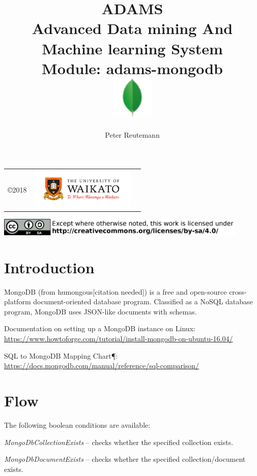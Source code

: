 \documentclass[a4paper]{book}
\title{
  \textbf{ADAMS} \\
  {\Large \textbf{A}dvanced \textbf{D}ata mining \textbf{A}nd \textbf{M}achine
  learning \textbf{S}ystem} \\
  {\Large Module: adams-mongodb} \\
  \vspace{1cm}
  \includegraphics[width=2cm]{images/mongodb-module.png} \\
}
\author{
  Peter Reutemann
}
\begin{document}
\begin{titlepage}
\maketitle

\thispagestyle{empty}
\center
\begin{table}[b]
	\begin{tabular}{c l l}
		\parbox[c][2cm]{2cm}{\copyright 2018} &
		\parbox[c][2cm]{5cm}{\includegraphics[width=5cm]{images/coat_of_arms.pdf}} \\
	\end{tabular}
	\includegraphics[width=12cm]{images/cc.png} \\
\end{table}

\end{titlepage}

\tableofcontents

\chapter{Introduction}
MongoDB (from humongous[citation needed]) is a free and open-source cross-platform
document-oriented database program. Classified as a NoSQL\cite{nosql} database program,
MongoDB uses JSON-like\cite{json} documents with schemas.

\begin{tight_itemize}
  \item Documentation on setting up a MongoDB instance on Linux: \\
    \url{https://www.howtoforge.com/tutorial/install-mongodb-on-ubuntu-16.04/}{}
  \item SQL to MongoDB Mapping Chart¶: \\
    \url{https://docs.mongodb.com/manual/reference/sql-comparison/}{}
\end{tight_itemize}

\chapter{Flow}
The following boolean conditions are available:
\begin{tight_itemize}
  \item \textit{MongoDbCollectionExists} -- checks whether the specified collection exists.
  \item \textit{MongoDbDocumentExists} -- checks whether the specified collection/document exists.
\end{tight_itemize}
\end{document}
